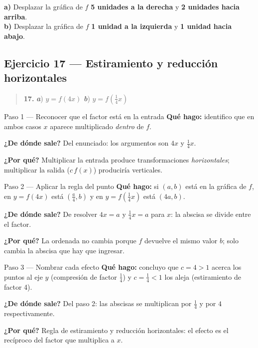 \documentclass[11pt]{article}
\begin{document}
\begin{resp}
\textbf{a)} Desplazar la gráfica de $f$ \textbf{5 unidades a la derecha} y \textbf{2 unidades hacia arriba}.\\
\textbf{b)} Desplazar la gráfica de $f$ \textbf{1 unidad a la izquierda} y \textbf{1 unidad hacia abajo}.
\end{resp}

\subsection*{Ejercicio 17 — Estiramiento y reducción horizontales}

\begin{quote}
\textbf{17.} \textbf{\textit{a}}) $y=f(4x)$ \hfill \textbf{\textit{b}}) $y=f\!\left(\tfrac14 x\right)$
\end{quote}

\begin{paso}{Paso 1 --- Reconocer que el factor está en la entrada}
\textbf{Qué hago:} identifico que en ambos casos $x$ aparece multiplicado \emph{dentro} de $f$.

\textbf{¿De dónde sale?} Del enunciado: los argumentos son $4x$ y $\tfrac14x$.

\textbf{¿Por qué?} Multiplicar la entrada produce transformaciones \emph{horizontales}; multiplicar la salida ($c\,f(x)$) produciría verticales.
\end{paso}

\begin{paso}{Paso 2 --- Aplicar la regla del punto}
\textbf{Qué hago:} si $(a,b)$ está en la gráfica de $f$, en $y=f(4x)$ está $\left(\tfrac{a}{4},b\right)$ y en $y=f\!\left(\tfrac14x\right)$ está $(4a,b)$.

\textbf{¿De dónde sale?} De resolver $4x=a$ y $\tfrac14x=a$ para $x$: la abscisa se divide entre el factor.

\textbf{¿Por qué?} La ordenada no cambia porque $f$ devuelve el mismo valor $b$; solo cambia la abscisa que hay que ingresar.
\end{paso}

\begin{paso}{Paso 3 --- Nombrar cada efecto}
\textbf{Qué hago:} concluyo que $c=4>1$ acerca los puntos al eje $y$ (compresión de factor $\tfrac14$) y $c=\tfrac14<1$ los aleja (estiramiento de factor 4).

\textbf{¿De dónde sale?} Del paso 2: las abscisas se multiplican por $\tfrac14$ y por $4$ respectivamente.

\textbf{¿Por qué?} Regla de estiramiento y reducción horizontales: el efecto es el recíproco del factor que multiplica a $x$.
\end{paso}
\end{document}
